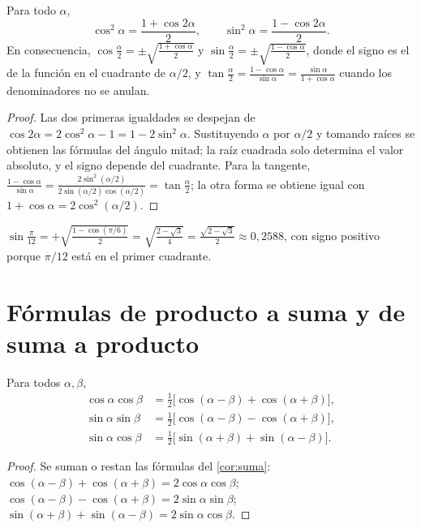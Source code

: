 \begin{corolario}\label{cor:mitad}
Para todo $\alpha$,
\[
\cos^{2}\alpha=\frac{1+\cos 2\alpha}{2},\qquad \sin^{2}\alpha=\frac{1-\cos 2\alpha}{2}.
\]
En consecuencia, $\cos\frac{\alpha}{2}=\pm\sqrt{\frac{1+\cos\alpha}{2}}$ y $\sin\frac{\alpha}{2}=\pm\sqrt{\frac{1-\cos\alpha}{2}}$, donde el signo es el de la función en el cuadrante de $\alpha/2$, y $\tan\frac{\alpha}{2}=\frac{1-\cos\alpha}{\sin\alpha}=\frac{\sin\alpha}{1+\cos\alpha}$ cuando los denominadores no se anulan.
\end{corolario}

\begin{proof}
Las dos primeras igualdades se despejan de $\cos2\alpha=2\cos^{2}\alpha-1=1-2\sin^{2}\alpha$. Sustituyendo $\alpha$ por $\alpha/2$ y tomando raíces se obtienen las fórmulas del ángulo mitad; la raíz cuadrada solo determina el valor absoluto, y el signo depende del cuadrante. Para la tangente, $\frac{1-\cos\alpha}{\sin\alpha}=\frac{2\sin^{2}(\alpha/2)}{2\sin(\alpha/2)\cos(\alpha/2)}=\tan\frac{\alpha}{2}$; la otra forma se obtiene igual con $1+\cos\alpha=2\cos^{2}(\alpha/2)$.
\end{proof}

\begin{ejemplo}\label{ej:mitad}
$\sin\frac{\pi}{12}=+\sqrt{\frac{1-\cos(\pi/6)}{2}}=\sqrt{\frac{2-\sqrt3}{4}}=\frac{\sqrt{2-\sqrt3}}{2}\approx 0{,}2588$, con signo positivo porque $\pi/12$ está en el primer cuadrante.
\end{ejemplo}

\section{Fórmulas de producto a suma y de suma a producto}

\begin{proposicion}\label{prop:producto-suma}
Para todos $\alpha,\beta$,
\begin{align*}
\cos\alpha\cos\beta&=\tfrac12\bigl[\cos(\alpha-\beta)+\cos(\alpha+\beta)\bigr],\\
\sin\alpha\sin\beta&=\tfrac12\bigl[\cos(\alpha-\beta)-\cos(\alpha+\beta)\bigr],\\
\sin\alpha\cos\beta&=\tfrac12\bigl[\sin(\alpha+\beta)+\sin(\alpha-\beta)\bigr].
\end{align*}
\end{proposicion}

\begin{proof}
Se suman o restan las fórmulas del \cref{cor:suma}: $\cos(\alpha-\beta)+\cos(\alpha+\beta)=2\cos\alpha\cos\beta$; $\cos(\alpha-\beta)-\cos(\alpha+\beta)=2\sin\alpha\sin\beta$; $\sin(\alpha+\beta)+\sin(\alpha-\beta)=2\sin\alpha\cos\beta$.
\end{proof}

